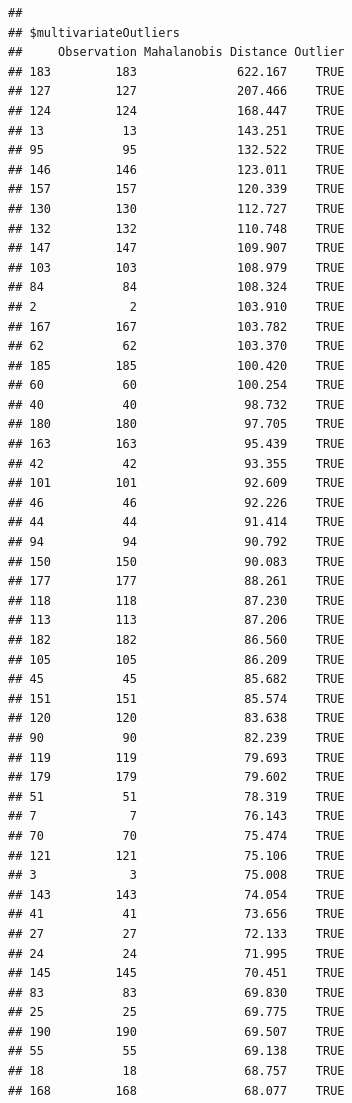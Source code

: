 \documentclass{article}\usepackage[]{graphicx}\usepackage[]{color}
\makeatletter
\newenvironment{kframe}{%
 \def\at@end@of@kframe{}%
 \ifinner\ifhmode%
  \def\at@end@of@kframe{\end{minipage}}%
  \begin{minipage}{\columnwidth}%
 \fi\fi%
 \def\FrameCommand##1{\hskip\@totalleftmargin \hskip-\fboxsep
 \colorbox{shadecolor}{##1}\hskip-\fboxsep
     \hskip-\linewidth \hskip-\@totalleftmargin \hskip\columnwidth}%
 \MakeFramed {\advance\hsize-\width
   \@totalleftmargin\z@ \linewidth\hsize
   \@setminipage}}%
 {\par\unskip\endMakeFramed%
 \at@end@of@kframe}
\newenvironment{knitrout}{}{} %
\makeatother
\begin{document}
\begin{knitrout}
\begin{kframe}
\begin{verbatim}
## 
## $multivariateOutliers
##     Observation Mahalanobis Distance Outlier
## 183         183              622.167    TRUE
## 127         127              207.466    TRUE
## 124         124              168.447    TRUE
## 13           13              143.251    TRUE
## 95           95              132.522    TRUE
## 146         146              123.011    TRUE
## 157         157              120.339    TRUE
## 130         130              112.727    TRUE
## 132         132              110.748    TRUE
## 147         147              109.907    TRUE
## 103         103              108.979    TRUE
## 84           84              108.324    TRUE
## 2             2              103.910    TRUE
## 167         167              103.782    TRUE
## 62           62              103.370    TRUE
## 185         185              100.420    TRUE
## 60           60              100.254    TRUE
## 40           40               98.732    TRUE
## 180         180               97.705    TRUE
## 163         163               95.439    TRUE
## 42           42               93.355    TRUE
## 101         101               92.609    TRUE
## 46           46               92.226    TRUE
## 44           44               91.414    TRUE
## 94           94               90.792    TRUE
## 150         150               90.083    TRUE
## 177         177               88.261    TRUE
## 118         118               87.230    TRUE
## 113         113               87.206    TRUE
## 182         182               86.560    TRUE
## 105         105               86.209    TRUE
## 45           45               85.682    TRUE
## 151         151               85.574    TRUE
## 120         120               83.638    TRUE
## 90           90               82.239    TRUE
## 119         119               79.693    TRUE
## 179         179               79.602    TRUE
## 51           51               78.319    TRUE
## 7             7               76.143    TRUE
## 70           70               75.474    TRUE
## 121         121               75.106    TRUE
## 3             3               75.008    TRUE
## 143         143               74.054    TRUE
## 41           41               73.656    TRUE
## 27           27               72.133    TRUE
## 24           24               71.995    TRUE
## 145         145               70.451    TRUE
## 83           83               69.830    TRUE
## 25           25               69.775    TRUE
## 190         190               69.507    TRUE
## 55           55               69.138    TRUE
## 18           18               68.757    TRUE
## 168         168               68.077    TRUE

\end{verbatim}
\end{kframe}
\end{knitrout}
\end{document}
